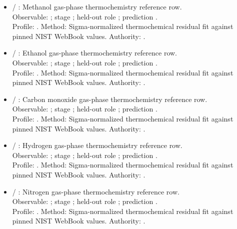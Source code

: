 \begin{itemize}
\item {} / : Methanol gas-phase thermochemistry reference row.\\ Observable: ; stage ; held-out role ; prediction .\\ Profile: . Method: Sigma-normalized thermochemical residual fit against pinned NIST WebBook values. Authority: .
\item {} / : Ethanol gas-phase thermochemistry reference row.\\ Observable: ; stage ; held-out role ; prediction .\\ Profile: . Method: Sigma-normalized thermochemical residual fit against pinned NIST WebBook values. Authority: .
\item {} / : Carbon monoxide gas-phase thermochemistry reference row.\\ Observable: ; stage ; held-out role ; prediction .\\ Profile: . Method: Sigma-normalized thermochemical residual fit against pinned NIST WebBook values. Authority: .
\item {} / : Hydrogen gas-phase thermochemistry reference row.\\ Observable: ; stage ; held-out role ; prediction .\\ Profile: . Method: Sigma-normalized thermochemical residual fit against pinned NIST WebBook values. Authority: .
\item {} / : Nitrogen gas-phase thermochemistry reference row.\\ Observable: ; stage ; held-out role ; prediction .\\ Profile: . Method: Sigma-normalized thermochemical residual fit against pinned NIST WebBook values. Authority: .

\end{itemize}
